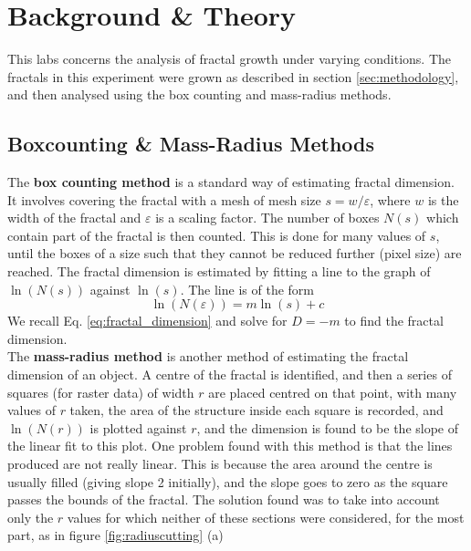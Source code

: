 \documentclass{article}
\theoremstyle{definition}
\theoremstyle{remark}
\begin{document}
\section{Background \& Theory}\label{sec:background}
This labs concerns the analysis of fractal growth under varying conditions. The fractals in this experiment were grown as described in section \ref{sec:methodology}, and then analysed using the box counting and mass-radius methods.\\
\subsection{Boxcounting \& Mass-Radius Methods}\label{sec:fractalmethods}
\indent The \textbf{box counting method} is a standard way of estimating fractal dimension. It involves covering the fractal with a mesh of mesh size $s = w/\varepsilon$, where $w$ is the width of the fractal and $\varepsilon$ is a scaling factor. The number of boxes $N(s)$ which contain part of the fractal is then counted. This is done for many values of $s$, until the boxes of a size such that they cannot be reduced further (pixel size) are reached. The fractal dimension is estimated by fitting a line to the graph of $\ln(N(s))$ against $\ln(s)$. The line is of the form
\begin{equation}
        \ln(N(\varepsilon)) = m\ln(s) + c
\end{equation}
We recall Eq. \ref{eq:fractal_dimension} and solve for $D=-m$ to find the fractal dimension.\\
\indent The \textbf{mass-radius method} is another method of estimating the fractal dimension of an object. A centre of the fractal is identified, and then a series of squares (for raster data) of width $r$ are placed centred on that point, with many values of $r$ taken, the area of the structure inside each square is recorded, and $\ln(N(r))$ is plotted against $r$, and the dimension is found to be the slope of the linear fit to this plot. One problem found with this method is that the lines produced are not really linear. This is because the area around the centre is usually filled (giving slope 2 initially), and the slope goes to zero as the square passes the bounds of the fractal. The solution found was to take into account only the $r$ values for which neither of these sections were considered, for the most part, as in figure \ref{fig:radiuscutting} (a)\\
\end{document}
